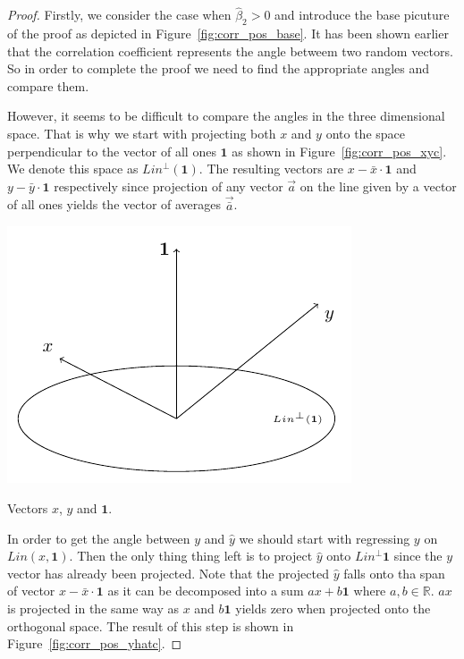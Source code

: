 \begin{proof}
Firstly, we consider the case when $\hat \beta_2 > 0$ and introduce the base
picuture of the proof as depicted in Figure~\ref{fig:corr_pos_base}.
It has been shown earlier that the correlation coefficient represents the angle
betweem two random vectors.
So in order to complete the proof we need to find the appropriate angles and compare them.


However, it seems to be difficult to compare the angles in the three dimensional space.
That is why we start with projecting both $x$ and $y$ onto the space perpendicular to the vector of all ones $\mathbf{1}$ as shown in Figure~\ref{fig:corr_pos_xyc}.
We denote this space as $Lin^{\perp}(\mathbf{1})$. The resulting vectors are $x - \bar x \cdot \mathbf{1}$  and $y - \bar y \cdot \mathbf{1}$ respectively
since projection of any vector $\vec{a}$ on the line given by a vector of all ones yields the vector of averages $\vec{\bar a}$.

\begin{marginfigure}[3\baselineskip]
\includegraphics[scale=0.7]{figures/02_simple_regression_coefficient_basic.pdf}
\caption{Vectors $x$, $y$ and $\mathbf{1}$.}
\label{fig:corr_pos_base}
\end{marginfigure}

In order to get the angle between $y$ and $\hat y$ we should start with regressing $y$ on $Lin(x, \mathbf{1})$.
Then the only thing thing left is to project $\hat y$ onto $Lin^{\perp}\mathbf{1}$ since the $y$ vector has already been projected.
Note that the projected $\hat y$ falls onto tha span of vector $x - \bar x \cdot \mathbf{1}$ as it can be decomposed into a sum $a x + b \mathbf{1}$ where $a, b \in \mathbb{R}$.
$a x$ is projected in the same way as $x$ and $b \mathbf{1}$ yields zero when projected onto the orthogonal space.
The result of this step is shown in Figure~\ref{fig:corr_pos_yhatc}.


\end{proof}
